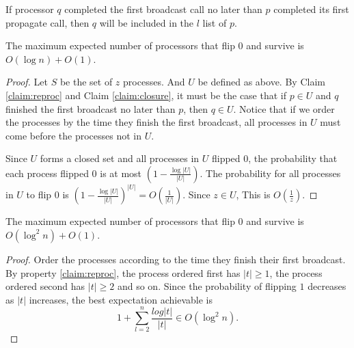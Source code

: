 \documentclass[
10pt, %
a4paper, %
onecolumn, %
]{article}
\begin{document}
\begin{claim}
\label{claim:reproc}
If processor $q$ completed the first broadcast call no later than $p$ completed its first propagate call, then $q$ will be included in the $l$ list of $p$.
\end{claim}

\begin{claim}
\label{claim:mainflip0}
The maximum expected number of processors that flip $0$ and survive is $O(\log n) + O(1)$.
\end{claim}
\begin{proof}
Let $S$ be the set of $z$ processes. And $U$ be defined as above. By Claim \ref{claim:reproc} and Claim \ref{claim:closure}, it must be the case that if $p \in U$ and $q$ finished the first broadcast no later than $p$, then $q \in U$. Notice that if we order the processes by the time they finish the first broadcast, all processes in $U$ must come before the processes not in $U$. 

Since $U$ forms a closed set and all processes in $U$ flipped $0$, the probability that each process flipped $0$ is at most $\left(1 - \frac{\log |U|}{|U|}\right)$. The probability for all processes in $U$ to flip $0$ is $\left(1 - \frac{\log |U|}{|U|}\right)^{|U|} = O\left(\frac{1}{|U|}\right)$. Since $z \in U$, This is $O\left(\frac{1}{z}\right)$.  
\end{proof}

\begin{claim}
\label{claim:mainflip1}
The maximum expected number of processors that flip $0$ and survive is $O(\log^2 n) + O(1)$.
\end{claim}
\begin{proof}
Order the processes according to the time they finish their first broadcast. By property \ref{claim:reproc}, the process ordered first has $|t| \geq 1$, the process ordered second has $|t| \geq 2$ and so on. Since the probability of flipping $1$ decreases as $|t|$ increases, the best expectation achievable is
\[1 + \sum_{l = 2}^{n} \frac{log|t|}{|t|} \in O(\log^2 n).\]
\end{proof}



\renewcommand{\refname}{Reference} %


\end{document}
